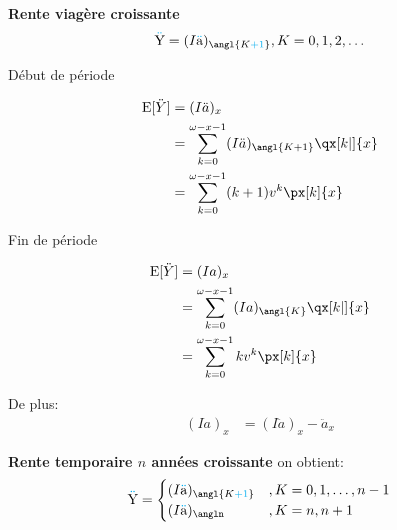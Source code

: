 \documentclass[10pt, french]{article}
\newcommand\cumlaut[2][black]{\stackon[.33ex]{#2}{\textcolor{#1}{\kern-.04ex.\kern-.2ex.}}}
\begin{document}
\begin{multicols*}{3}
\textbf{Rente viagère croissante}
\begin{align*}
	\cumlaut[cyan]{Y}
	&=	(I\cumlaut[cyan]{a})_{\angl{K \textcolor{cyan}{+ 1}}}, K = 0, 1, 2, \dots	\\
\end{align*}

\setlength{\mathindent}{-1cm}
\begin{minipage}[t]{0.5\columnwidth}
\begin{center}
Début de période
\end{center}
\begin{align*}
	\text{E}[\ddot{Y}]
	&=	(I\ddot{a})_{x}	\\
	&=	\sum_{k = 0}^{\omega - x - 1} (I\ddot{a})_{\angl{K + 1}} \qx[k|]{x}	\\
	&=	\sum_{k = 0}^{\omega - x - 1} (k + 1) v^{k} \px[k]{x}
\end{align*}
\end{minipage}
\begin{minipage}[t]{0.5\columnwidth}
\begin{center}
Fin de période
\end{center}
\begin{align*}
	\text{E}[\ddot{Y}]
	&=	(Ia)_{x}	\\
	&=	\sum_{k = 0}^{\omega - x - 1} (Ia)_{\angl{K}} \qx[k|]{x}	\\
	&=	\sum_{k = 0}^{\omega - x - 1} k v^{k} \px[k]{x}
\end{align*}
\end{minipage}
\setlength{\mathindent}{1cm}

De plus:
\begin{align*}
	(Ia)_{x}
	&=	(I\ddot{a})_{x}	-	\ddot{a}_{x}
\end{align*}

\textbf{Rente temporaire $n$ années croissante}
on obtient:
\begin{align*}
	\cumlaut[cyan]{Y}
	&= 	\begin{cases}
			(I\cumlaut[cyan]{a})_{\angl{K \textcolor{cyan}{+ 1}}}	& , K = 0, 1, \dots, n - 1 \\
			(I\cumlaut[cyan]{a})_{\angln}			& , K = n, n + 1 \\
		\end{cases} 	\\
\end{align*}


\end{multicols*}
\end{document}
